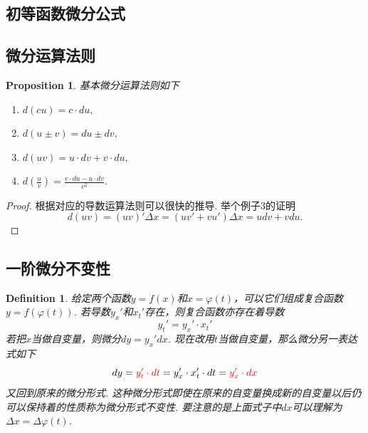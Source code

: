\documentclass{article}
\newtheorem{proposition}[theorem]{Proposition}
\newtheorem{definition}[theorem]{Definition}
\begin{document}
\subsection{初等函数微分公式}


\subsection{微分运算法则}

\begin{proposition}
\rm 基本{\color{red}微分运算法则}如下
\begin{enumerate}
	\item $d(cu) = c\cdot du,$
	\item $d(u\pm v)= du \pm dv,$
	\item $d(uv) = u\cdot dv + v\cdot du,$
	\item $d(\frac{u}{v}) = \frac{v\cdot du - u \cdot dv}{v^2}.$
\end{enumerate}
\end{proposition}

\begin{proof}
{\color{blue}根据对应的导数运算法则可以很快的推导}. 举个例子3的证明
$$
d(uv) = (uv)'\Delta x = (uv'+vu')\Delta x = udv + vdu.
$$
\end{proof}

\subsection{一阶微分不变性}

\begin{definition}
\rm 给定两个函数$y = f(x)$和$x = \varphi(t)$，可以它们组成复合函数$y = f(\varphi(t))$. 若导数$y_x'$和$x_t'$存在，则复合函数亦存在着导数
$$
y_t' = y_x' \cdot x_t'
$$
若把$x$当做自变量，则微分$dy = y_x'dx$. 现在改用$t$当做自变量，那么微分另一表达式如下
$$
dy = {\color{red}y_t' \cdot dt} = y_x' \cdot x_t' \cdot dt = {\color{red}y_x' \cdot dx}
$$
又回到原来的微分形式. 这种微分形式即使在原来的自变量换成新的自变量以后仍可以保持着的性质称为{\color{red}微分形式不变性}. {\color{blue}要注意的是上面式子中$dx$可以理解为$\Delta x = \Delta \varphi(t)$}.
\end{definition}
\end{document}
